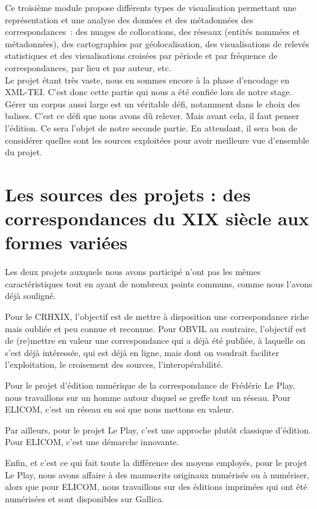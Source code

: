 Ce troisième module propose différents types de visualisation permettant une représentation et une analyse des données et des métadonnées des correspondances : des nuages de collocations, des réseaux (entités nommées et métadonnées), des cartographies par géolocalisation, des visualisations de relevés statistiques et des visualisations croisées par période et par fréquence de correspondances, par lieu et par auteur, etc.\\

Le projet étant très vaste, nous en sommes encore à la phase d'encodage en XML-TEI. C'est donc cette partie qui nous a été confiée lors de notre stage. Gérer un corpus aussi large est un véritable défi, notamment dans le choix des balises. C'est ce défi que nous avons dû relever. Mais avant cela, il faut penser l'édition. Ce sera l'objet de notre seconde partie. En attendant, il sera bon de considérer quelles sont les sources exploitées pour avoir meilleure vue d'ensemble du projet.




\chapter{Les sources des projets : des correspondances du XIX siècle aux formes variées}

Les deux projets auxquels nous avons participé n'ont pas les mêmes caractéristiques tout en ayant de nombreux points communs, comme nous l'avons déjà souligné.

Pour le CRHXIX, l'objectif est de mettre à disposition une correspondance riche mais oubliée et peu connue et reconnue.
Pour OBVIL au contraire, l'objectif est de (re)mettre en valeur une correspondance qui a déjà été publiée, à laquelle on s’est déjà intéressée, qui est déjà en ligne, mais dont on voudrait faciliter l’exploitation, le croisement des sources, l'interopérabilité. 

Pour le projet d'édition numérique de la correspondance de Frédéric Le Play, nous travaillons sur un homme autour duquel se greffe tout un réseau. Pour ELICOM, c'est un réseau en soi que nous mettons en valeur.

Par ailleurs, pour le projet Le Play, c'est une approche plutôt classique d'édition. Pour ELICOM, c'est une démarche innovante.

Enfin, et c'est ce qui fait toute la différence des moyens employés, pour le projet Le Play, nous avons affaire à des manuscrits originaux numérisés ou à numériser, alors que pour ELICOM, nous travaillons sur des éditions imprimées qui ont été numérisées et sont disponibles sur Gallica.

